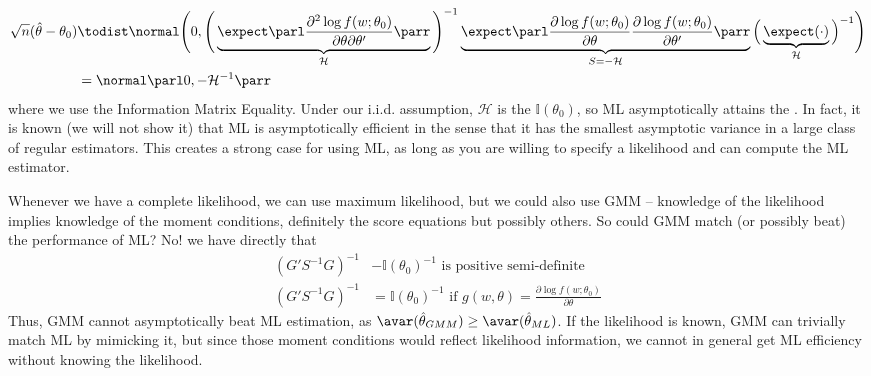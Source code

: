 \documentclass[10pt]{article}
\begin{document}
\begin{remark}
	\begin{align*}
		\sqrt{n}(\hat{\theta} - \theta_0) &\todist \normal \Bigg( 0,\Bigg(\underbrace{ \expect \parl \frac{\partial^2 \log f(w;\theta_0)}{\partial \theta \partial \theta'}\parr}_{\mathcal{H}}\Bigg)^{-1} \underbrace{\expect \parl \frac{\partial \log f(w;\theta_0)}{\partial \theta}\frac{\partial \log f(w;\theta_0)}{\partial \theta'}\parr}_{S = -\mathcal{H}} \Big( \underbrace{\expect(\cdot)}_{\mathcal{H}}\Big)^{-1}\Bigg)\\
		&= \normal\parl0,-\mathcal{H}^{-1}\parr
	\end{align*}
	where we use the Information Matrix Equality. Under our i.i.d. assumption, $\mathcal{H}$ is the  $\mathbb{I}(\theta_0)$, so ML asymptotically attains the . In fact, it is known (we will not show it) that ML is asymptotically efficient in the sense that it has the smallest asymptotic variance in a large class of regular estimators. This creates a strong case for using ML, as long as you are willing to specify a likelihood and can compute the ML estimator.
\end{remark}


\begin{remark}
	Whenever we have a complete likelihood, we can use maximum likelihood, but we could also use GMM -- knowledge of the likelihood implies knowledge of the moment conditions, definitely the score equations but possibly others. So could GMM match (or possibly beat) the performance of ML? No! we have directly that 
	\begin{align*}
		(G'S^{-1}G)^{-1} &- \mathbb{I}(\theta_0)^{-1} \text{ is positive semi-definite} \\
		(G'S^{-1}G)^{-1} &= \mathbb{I}(\theta_0)^{-1} \text{ if } g(w,\theta) = \frac{\partial \log f(w;\theta_0)}{\partial \theta}
	\end{align*}
	Thus, GMM cannot asymptotically beat ML estimation, as $\avar(\hat{\theta}_{GMM}) \ge \avar(\hat{\theta}_{ML})$. If the likelihood is known, GMM can trivially match ML by mimicking it, but since those moment conditions would reflect likelihood information, we cannot in general get ML efficiency without knowing the likelihood.
\end{remark}
\end{document}
